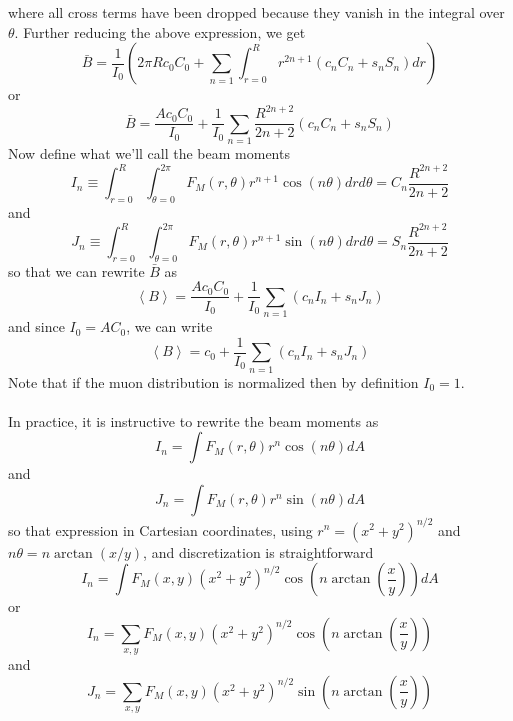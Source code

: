 \documentclass[twoside]{article}
\begin{document}
where all cross terms have been dropped because they vanish in the integral over $\theta$. Further reducing the above expression, we get 
\begin{equation}
\bar{B} = \frac{1}{I_0}(2 \pi R c_0C_0 + \sum_{n=1} \int^R_{r=0} r^{2n + 1}(c_nC_n + s_n S_n ) dr  ) 
\end{equation}
or 
\begin{equation}
\bar{B} = 
\frac{A c_0 C_0}{I_0} + \frac{1}{I_0}\sum_{n=1} \frac{R^{2n + 2}}{2n+2}(c_nC_n + s_n S_n ) 
\end{equation}
Now define what we'll call the beam moments
\begin{equation}
\boxed{
	I_n \equiv \int^{R}_{r = 0}  \int^{2\pi}_{\theta = 0} F_M(r,\theta) r^{n+1} \cos(n\theta) dr d\theta = C_n\frac{R^{2n+2}}{2n + 2}
}
\end{equation}
and
\begin{equation}
\boxed{
	J_n \equiv \int^{R}_{r = 0}  \int^{2\pi}_{\theta = 0} F_M(r,\theta) r^{n+1} \sin(n\theta) dr d\theta = S_n\frac{R^{2n+2}}{2n + 2}
}
\end{equation}
so that we can rewrite $\bar{B}$ as
\begin{equation}
\left\langle B \right\rangle = 
\frac{A c_0 C_0}{I_0} + \frac{1}{I_0}\sum_{n=1}(c_n I_n + s_n J_n ) 
\end{equation}
and since $I_0 = A C_0$, we can write
\begin{equation}
\boxed{
\left\langle B \right\rangle = 
c_0 + \frac{1}{I_0}\sum_{n=1}(c_n I_n + s_n J_n ) 
}
\end{equation}
Note that if the muon distribution is normalized then by definition $I_0 = 1$. \\
\\
In practice, it is instructive to rewrite the beam moments as
\begin{equation}
	I_n = \int F_M(r,\theta) r^{n} \cos(n\theta) dA 
\end{equation}
and
\begin{equation}
J_n = \int F_M(r,\theta) r^{n} \sin(n\theta) dA 
\end{equation}
so that expression in Cartesian coordinates, using $r^n=(x^2 + y^2)^{n/2}$ and $n \theta = n \arctan(x/y)$, and discretization is straightforward
\begin{equation}
I_n =  \int F_M(x,y) (x^2 + y^2)^{n/2} \cos(n  \arctan(\frac{x}{y})) dA 
\end{equation}
or 
\begin{equation}
\boxed{
I_n =  \sum_{x,y} F_M(x,y) (x^2 + y^2)^{n/2} \cos(n  \arctan(\frac{x}{y}))
}
\end{equation}
and
\begin{equation}
\boxed{
	J_n =  \sum_{x,y} F_M(x,y) (x^2 + y^2)^{n/2} \sin(n  \arctan(\frac{x}{y}))
}
\end{equation}
\end{document}

